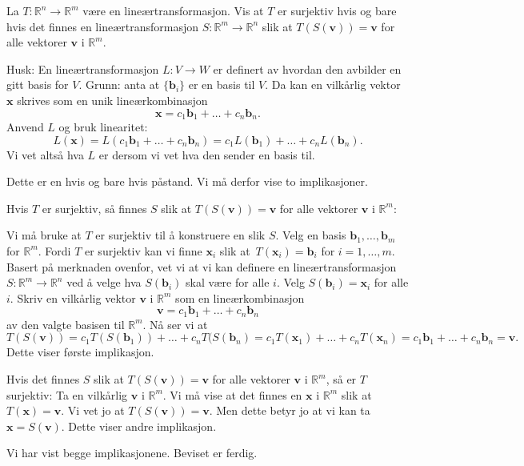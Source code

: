 \documentclass[titlepage,a4paper,12pt,norsk]{IMFeksamen}
\newcommand{\R}{\mathbb{R}}
\newcommand{\V}[1]{\mathbf{#1}}
\renewcommand{\v}{\V{v}}
\renewcommand{\b}{\V{b}}
\newcommand{\x}{\V{x}}
\newcommand{\0}{\V{0}}
\begin{document}
\begin{oppgave}
La $T \colon \R^n \to \R^m$ være en lineærtransformasjon.
Vis at $T$ er surjektiv hvis og bare hvis det finnes en
lineærtransformasjon $S \colon \R^m \to \R^n$ slik at
$T(S(\v)) = \v$ for alle vektorer $\v$ i $\R^m$.


Husk: En lineærtransformasjon $L\colon V\rightarrow W$ er definert av hvordan den avbilder en gitt basis for $V$. Grunn: anta at $\{\b_i\}$ er en basis til $V$. Da kan en vilkårlig vektor $\x$ skrives som en unik lineærkombinasjon \[
\x=c_1\b_1+\dots+c_n\b_n.
\]
Anvend $L$ og bruk linearitet:\[
L(\x)=L(c_1\b_1+\dots+c_n\b_n)=c_1L(\b_1)+\dots+c_nL(\b_n).
\]
Vi vet altså hva $L$ er dersom vi vet hva den sender en basis til.


Dette er en hvis og bare hvis påstand. Vi må derfor vise to implikasjoner.

Hvis $T$ er surjektiv, så finnes $S$ slik at $T(S(\v)) = \v$ for alle vektorer $\v$ i $\mathbb{R}^m$:

Vi må bruke at $T$ er surjektiv til å konstruere en slik $S$. Velg en basis $\b_1,\dots,\b_m$ for $\mathbb{R}^m$. Fordi $T$ er surjektiv kan vi finne $\x_i$ slik at~$T(\x_i)=\b_i$ for $i=1,\dots,m$. Basert på merknaden ovenfor, vet vi at vi kan definere en lineærtransformasjon $S\colon \mathbb{R}^m\rightarrow \mathbb{R}^n$ ved å velge hva $S(\b_i)$ skal være for alle $i$. Velg $S(\b_i)=\x_i$ for alle $i$. Skriv en vilkårlig vektor $\v$ i $\mathbb{R}^m$ som en lineærkombinasjon \[
\v=c_1\b_1+\dots+c_n\b_n
\]
av den valgte basisen til $\mathbb{R}^m$. Nå ser vi at 
\[
T(S(\v))=c_1T(S(\b_1))+\dots+c_nT(S(\b_n)=c_1T(\x_1)+\dots+c_nT(\x_n)=c_1\b_1+\dots+c_n\b_n=\v.
\]
Dette viser første implikasjon.

Hvis det finnes $S$ slik at $T(S(\v)) = \v$ for alle vektorer $\v$ i $\mathbb{R}^m$, så er $T$ surjektiv:
Ta en vilkårlig $\v$ i $\mathbb{R}^m$. Vi må vise at det finnes en $\x$ i $\mathbb{R}^m$ slik at $T(\x)=\v$. Vi vet jo at $T(S(\v))=\v$. Men dette betyr jo at vi kan ta $\x=S(\v)$. Dette viser andre implikasjon.

Vi har vist begge implikasjonene. Beviset er ferdig.



\end{oppgave}
\end{document}
